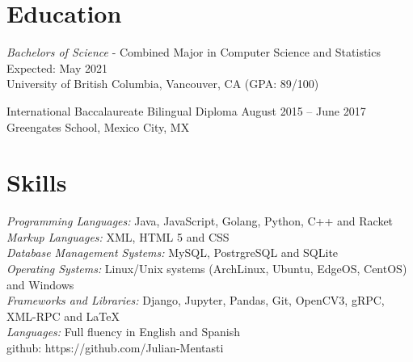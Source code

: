 \documentclass[letter]{res}
\begin{document}
\address{ (778)-882-3453 \\}
\address{
  \texttt{julian@mentasti.net}\\ } 
\begin{resume}
  \noindent\makebox[\linewidth]{\rule{\paperwidth}{0.4pt}}

\section{Education}
{\sl Bachelors of Science} - Combined Major in Computer Science and Statistics \hfill Expected: May 2021\\
University of British Columbia,  Vancouver, CA \hfill (GPA: 89/100)
  \vspace{-4mm}
  
International Baccalaureate Bilingual Diploma \hfill August 2015 – June 2017\\
Greengates School, Mexico City, MX
 \vspace{-2mm}

\section{Skills}
{\sl Programming Languages:}  Java, JavaScript, Golang, Python, C++ and Racket\\
{\sl Markup Languages:} XML, HTML 5 and CSS \\
{\sl Database Management Systems:} MySQL, PostrgreSQL and SQLite \\
{\sl Operating Systems:} Linux/Unix systems (ArchLinux, Ubuntu, EdgeOS, CentOS) and Windows \\ 
{\sl Frameworks and Libraries:} Django, Jupyter, Pandas, Git, OpenCV3, gRPC, XML-RPC and  \LaTeX \\ 
{\sl Languages:} Full fluency in English and Spanish \\
github: https://github.com/Julian-Mentasti
 \vspace{-4mm}


\end{resume}
\end{document}

